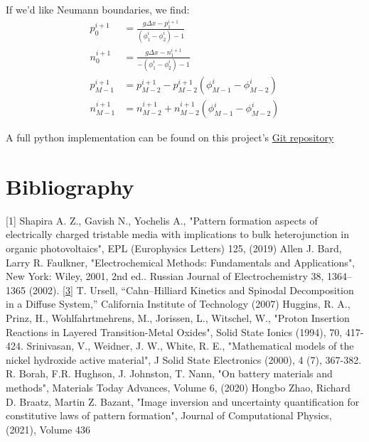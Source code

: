 \documentclass[12pt]{article}
\begin{document}
If we'd like Neumann boundaries, we find:
\begin{align}
    p_0^{i+1} &= \frac{g\Delta x - p_1^{i+1}}{(\phi_1^{i} - \phi_2^{i})-1} \\
    n_0^{i+1} &= \frac{g\Delta x - n_1^{i+1}}{-(\phi_1^{i} - \phi_2^{i})-1} \\
    p_{M-1}^{i+1} &= p_{M-2}^{i+1} - p_{M-2}^{i+1}{(\phi_{M-1}^{i} - \phi_{M-2}^{i})} \\
    n_{M-1}^{i+1} &= n_{M-2}^{i+1} + n_{M-2}^{i+1}{(\phi_{M-1}^{i} - \phi_{M-2}^{i})} 
\end{align}

A full python implementation can be found on this project's \href{https://github.com/nadav7679/phase_field_Ni_batteries/blob/main/pnp_finite_difference.ipynb}{Git repository}

\pagebreak
\section{Bibliography}
[1] Shapira A. Z., Gavish N., Yochelis A., "Pattern formation aspects of electrically charged tristable media with implications to bulk heterojunction in organic photovoltaics", EPL (Europhysics Letters) 125, (2019) 
\label{c:1}
\newline \newline
[2] Allen J. Bard, Larry R. Faulkner, "Electrochemical Methods: Fundamentals and Applications", New York: Wiley, 2001, 2nd ed.. Russian Journal of Electrochemistry 38, 1364–1365 (2002). \label{c:2}
\newline \newline
\href{https://www.phys.uconn.edu/~rozman/Courses/P2200_14F/downloads/cahn-hilliard/docs/spinodal.pdf}{[3]} T. Ursell, “Cahn–Hilliard Kinetics and Spinodal Decomposition in a Diffuse System,” California Institute of Technology (2007) \label{c:3}
\newline \newline
[4] Huggins, R. A., Prinz, H., Wohlfahrtmehrens, M., Jorissen, L., Witschel, W., "Proton Insertion Reactions in Layered Transition-Metal Oxides", Solid State Ionics (1994), 70, 417-424. \label{c:4}
\newline \newline
[5] Srinivasan, V., Weidner, J. W., White, R. E., "Mathematical models of the nickel hydroxide active material", J Solid State Electronics (2000), 4 (7), 367-382. \label{c:5}
\newline \newline
[6] R. Borah, F.R. Hughson, J. Johnston, T. Nann, "On battery materials and methods", Materials Today Advances, Volume 6, (2020) \label{c:6}
\newline \newline
[7] Hongbo Zhao, Richard D. Braatz, Martin Z. Bazant, "Image inversion and uncertainty quantification for constitutive laws of pattern formation", Journal of Computational Physics, (2021), Volume 436 \label{c:7}
\end{document}
